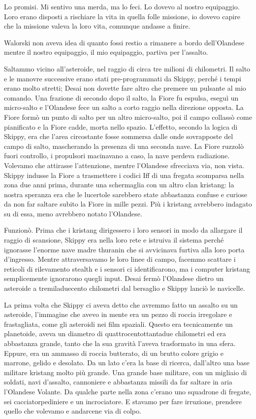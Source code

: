 Lo promisi. Mi sentivo una merda, ma lo feci. Lo dovevo al nostro
equipaggio. Loro erano disposti a rischiare la vita in quella folle
missione, io dovevo capire che la missione valeva la loro vita, comunque
andasse a finire.

Walorski non aveva idea di quanto fossi restio a rimanere a bordo
dell'Olandese mentre il nostro equipaggio, il mio equipaggio, partiva
per l'assalto.

\hfill\break

Saltammo vicino all'asteroide, nel raggio di circa tre milioni di
chilometri. Il salto e le manovre successive erano stati pre-programmati
da Skippy, perché i tempi erano molto stretti; Desai non dovette fare
altro che premere un pulsante al mio comando. Una frazione di secondo
dopo il salto, la Fiore fu espulsa, eseguì un micro-salto e l'Olandese
fece un salto a corto raggio nella direzione opposta. La Fiore formò un
punto di salto per un altro micro-salto, poi il campo collassò come
pianificato e la Fiore cadde, morta nello spazio. L'effetto, secondo la
logica di Skippy, era che l'area circostante fosse sommersa dalle onde
sovrapposte del campo di salto, mascherando la presenza di una seconda
nave. La Fiore ruzzolò fuori controllo, i propulsori macinavano a caso,
la nave perdeva radiazione. Volevamo che attirasse l'attenzione, mentre
l'Olandese sfrecciava via, non vista. Skippy indusse la Fiore a
trasmettere i codici Iff di una fregata scomparsa nella zona due anni
prima, durante una schermaglia con un altro clan kristang: la nostra
speranza era che le lucertole sarebbero state abbastanza confuse e
curiose da non far saltare subito la Fiore in mille pezzi. Più i
kristang avrebbero indagato su di essa, meno avrebbero notato
l'Olandese.

Funzionò. Prima che i kristang dirigessero i loro sensori in modo da
allargare il raggio di scansione, Skippy era nella loro rete e istruiva
il sistema perché ignorasse l'enorme nave madre thuranin che si
avvicinava furtiva alla loro porta d'ingresso. Mentre attraversavamo le
loro linee di campo, facemmo scattare i reticoli di rilevamento stealth
e i sensori ci identificarono, ma i computer kristang semplicemente
ignorarono quegli input. Desai fermò l'Olandese dietro un asteroide a
tremiladuecento chilometri dal bersaglio e Skippy lanciò le navicelle.

La prima volta che Skippy ci aveva detto che avremmo fatto un assalto su
un asteroide, l'immagine che avevo in mente era un pezzo di roccia
irregolare e frastagliata, come gli asteroidi nei film spaziali. Questo
era tecnicamente un planetoide, aveva un diametro di
quattrocentottantadue chilometri ed era abbastanza grande, tanto che la
sua gravità l'aveva trasformato in una sfera. Eppure, era un ammasso di
roccia butterato, di un brutto colore grigio e marrone, gelido e
desolato. Da un lato c'era la base di ricerca, dall'altro una base
militare kristang molto più grande. Una grande base militare, con un
migliaio di soldati, navi d'assalto, cannoniere e abbastanza missili da
far saltare in aria l'Olandese Volante. Da qualche parte nella zona
c'erano uno squadrone di fregate, sei cacciatorpediniere e un
incrociatore. E stavamo per fare irruzione, prendere quello che volevamo
e andarcene via di colpo.

